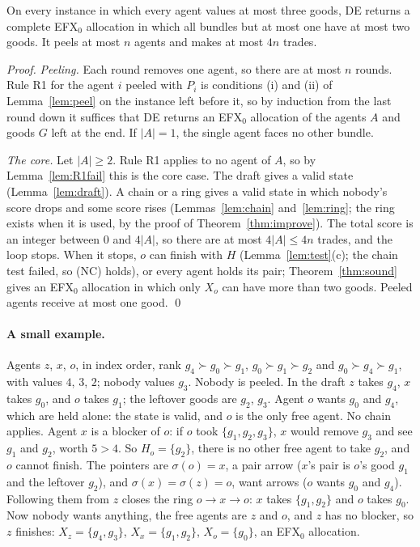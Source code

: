 \documentclass[runningheads,11pt]{llncs}
\newcommand{\efxz}{\texorpdfstring{\mbox{EFX$_0$}}{EFX0}}
\newcommand{\DE}{\textup{DE}}
\begin{document}
\begin{theorem}[\DE{} is correct]\label{thm:de}
On every instance in which every agent values at most three goods, \DE{} returns a complete \efxz{} allocation in which all bundles but at most one have at most two goods. It peels at most $n$ agents and makes at most $4n$ trades.
\end{theorem}

\begin{proof}
\emph{Peeling.} Each round removes one agent, so there are at most $n$ rounds. Rule R1 for the agent $i$ peeled with $P_i$ is conditions (i) and (ii) of Lemma~\ref{lem:peel} on the instance left before it, so by induction from the last round down it suffices that \DE{} returns an \efxz{} allocation of the agents $A$ and goods $G$ left at the end. If $|A|=1$, the single agent faces no other bundle.

\emph{The core.} Let $|A|\ge2$. Rule R1 applies to no agent of $A$, so by Lemma~\ref{lem:R1fail} this is the core case. The draft gives a valid state (Lemma~\ref{lem:draft}). A chain or a ring gives a valid state in which nobody's score drops and some score rises (Lemmas~\ref{lem:chain} and~\ref{lem:ring}; the ring exists when it is used, by the proof of Theorem~\ref{thm:improve}). The total score is an integer between $0$ and $4|A|$, so there are at most $4|A|\le4n$ trades, and the loop stops. When it stops, $o$ can finish with $H$ (Lemma~\ref{lem:test}(c); the chain test failed, so (NC) holds), or every agent holds its pair; Theorem~\ref{thm:sound} gives an \efxz{} allocation in which only $X_o$ can have more than two goods. Peeled agents receive at most one good. \qed
\end{proof}

\paragraph{A small example.} Agents $z$, $x$, $o$, in index order, rank $g_4\succ g_0\succ g_1$, $g_0\succ g_1\succ g_2$ and $g_0\succ g_4\succ g_1$, with values $4$, $3$, $2$; nobody values $g_3$. Nobody is peeled. In the draft $z$ takes $g_4$, $x$ takes $g_0$, and $o$ takes $g_1$; the leftover goods are $g_2$, $g_3$. Agent $o$ wants $g_0$ and $g_4$, which are held alone: the state is valid, and $o$ is the only free agent. No chain applies. Agent $x$ is a blocker of $o$: if $o$ took $\{g_1,g_2,g_3\}$, $x$ would remove $g_3$ and see $g_1$ and $g_2$, worth $5>4$. So $H_o=\{g_2\}$, there is no other free agent to take $g_2$, and $o$ cannot finish. The pointers are $\sigma(o)=x$, a pair arrow ($x$'s pair is $o$'s good $g_1$ and the leftover $g_2$), and $\sigma(x)=\sigma(z)=o$, want arrows ($o$ wants $g_0$ and $g_4$). Following them from $z$ closes the ring $o\to x\to o$: $x$ takes $\{g_1,g_2\}$ and $o$ takes $g_0$. Now nobody wants anything, the free agents are $z$ and $o$, and $z$ has no blocker, so $z$ finishes: $X_z=\{g_4,g_3\}$, $X_x=\{g_1,g_2\}$, $X_o=\{g_0\}$, an \efxz{} allocation.
\end{document}
